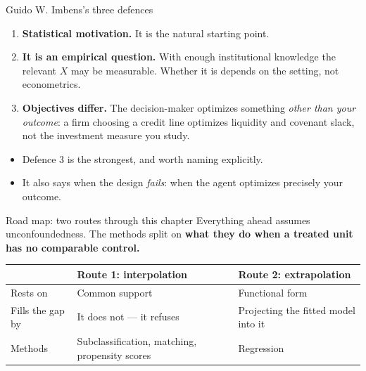 \documentclass[
  11pt,
  ignorenonframetext,
  aspectratio=169,
]{beamer}
\providecommand{\tightlist}{%
  \setlength{\itemsep}{0pt}\setlength{\parskip}{0pt}}
\begin{document}
\begin{frame}{Guido W. Imbens's three defences}
\protect{}\label{guido-w.-imbenss-three-defences}
\begin{enumerate}
\tightlist
\item
  \textbf{Statistical motivation.} It is the natural starting point.
\item
  \textbf{It is an empirical question.} With enough institutional
  knowledge the relevant \(X\) may be measurable. Whether it is depends
  on the setting, not econometrics.
\item
  \textbf{Objectives differ.} The decision-maker optimizes something
  \emph{other than your outcome}: a firm choosing a credit line
  optimizes liquidity and covenant slack, not the investment measure you
  study.
\end{enumerate}

\vspace{0.3em}

\begin{itemize}
\tightlist
\item
  Defence 3 is the strongest, and worth naming explicitly.
\item
  It also says when the design \emph{fails}: when the agent optimizes
  precisely your outcome.
\end{itemize}
\end{frame}

\begin{frame}{Road map: two routes through this chapter}
\protect{}\label{road-map-two-routes-through-this-chapter}
Everything ahead assumes unconfoundedness. The methods split on
\textbf{what they do when a treated unit has no comparable control.}

\begin{center}
\begin{tabular}{lp{4.3cm}p{4.3cm}}
\toprule
 & \textbf{Route 1: interpolation} & \textbf{Route 2: extrapolation} \\
\midrule
Rests on       & Common support & Functional form \\
Fills the gap by & It does not --- it refuses & Projecting the fitted model into it \\
Methods        & Subclassification, matching, propensity scores & Regression \\
\bottomrule
\end{tabular}
\end{center}
\end{frame}
\end{document}
